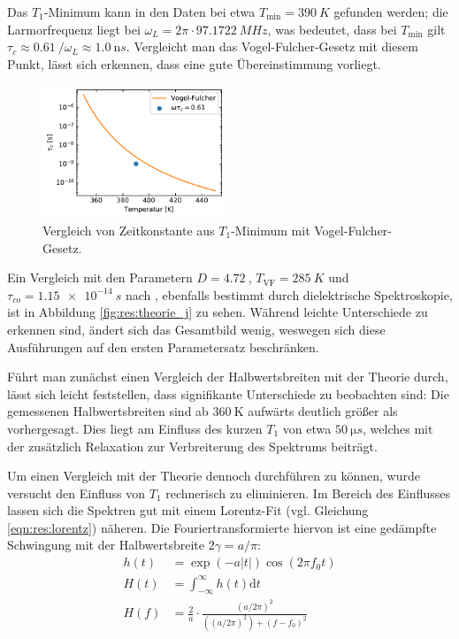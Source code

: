 Das $T_1$-Minimum kann in den Daten bei etwa $T_\text{min} = \SI{390}{K}$ gefunden werden; die Larmorfrequenz liegt bei $\omega_L = 2\pi \cdot \SI{97.1722}{MHz}$, was bedeutet, dass bei $T_\text{min}$ gilt $\tau_c \approx \SI{0.61}{} / \omega_L \approx \SI{1.0}{\nano s}$. Vergleicht man das Vogel-Fulcher-Gesetz mit diesem Punkt, lässt sich erkennen, dass eine gute Übereinstimmung vorliegt.

\begin{figure}
	\vspace{-20pt}
	\begin{center}
		\includegraphics[width=0.49\textwidth]{graphics/plot/vftau.pdf}
	\end{center}
	\vspace{-20pt}
	\caption{Vergleich von Zeitkonstante aus $T_1$-Minimum mit Vogel-Fulcher-Gesetz. \label{fig:korrelationszeiten}}
\end{figure}

Ein Vergleich mit den Parametern $D = \SI{4.72}{}$, $T_\text{VF} = \SI{285}{K}$ und $\tau_{co} = \SI{1.15e-14}{s}$ nach \cite{crn_augsburg}, ebenfalls bestimmt durch dielektrische Spektroskopie, ist in Abbildung \ref{fig:res:theorie_j} zu sehen. Während leichte Unterschiede zu erkennen sind, ändert sich das Gesamtbild wenig, weswegen sich diese Ausführungen auf den ersten Parametersatz beschränken.




Führt man zunächst einen Vergleich der Halbwertsbreiten mit der Theorie durch, lässt sich leicht feststellen, dass signifikante Unterschiede zu beobachten sind: Die gemessenen Halbwertsbreiten sind ab $\SI{360}{\kelvin}$ aufwärts deutlich größer als vorhergesagt. Dies liegt am Einfluss des kurzen $T_1$ von etwa $\SI{50}{\micro s}$, welches mit der zusätzlich Relaxation zur Verbreiterung des Spektrums beiträgt.

Um einen Vergleich mit der Theorie dennoch durchführen zu können, wurde versucht den Einfluss von $T_1$ rechnerisch zu eliminieren. Im Bereich des Einflusses lassen sich die Spektren gut mit einem Lorentz-Fit (vgl. Gleichung \eqref{eqn:res:lorentz}) näheren. Die Fouriertransformierte hiervon ist eine gedämpfte Schwingung mit der Halbwertsbreite $2 \gamma = a/\pi$:
\begin{align}
	h(t) & = \exp{(-a |t|)} \cos{(2 \pi f_0 t)}                              \\
	H(t) & = \int_{-\infty}^{\infty} h(t) \text{d} t                         \\
	H(f) & = \frac{2}{a} \cdot \frac{(a/2\pi)^2}{((a/2\pi)^2) + (f - f_0)^2}
\end{align}

